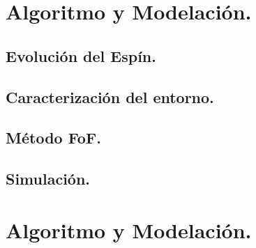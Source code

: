 \begin{savequote}[50mm]
\end{savequote}

\chapter{Algoritmo y Modelación.}
\label{cha:Modelo de Spin}
    


\section{Evolución del Espín.}
\label{sec:Evolucion espin}


\section{Caracterización del entorno.}
\label{sec: Caracterizacion_entorno}


\section{Método FoF.}
\label{sec: Método FoF}


\section{Simulación.}
\label{sec: SImulación}


\chapter{Algoritmo y Modelación.}
\label{cha:Algoritmo y Modelación}














